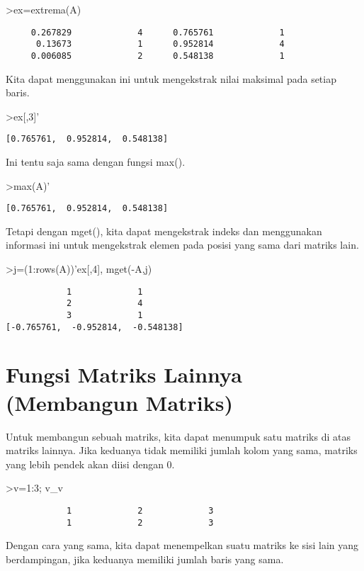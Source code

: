 \documentclass[
]{book}
\begin{document}
\textgreater ex=extrema(A)

\begin{verbatim}
     0.267829             4      0.765761             1 
      0.13673             1      0.952814             4 
     0.006085             2      0.548138             1 
\end{verbatim}

Kita dapat menggunakan ini untuk mengekstrak nilai maksimal pada setiap baris.

\textgreater ex{[},3{]}'

\begin{verbatim}
[0.765761,  0.952814,  0.548138]
\end{verbatim}

Ini tentu saja sama dengan fungsi max().

\textgreater max(A)'

\begin{verbatim}
[0.765761,  0.952814,  0.548138]
\end{verbatim}

Tetapi dengan mget(), kita dapat mengekstrak indeks dan menggunakan informasi ini untuk mengekstrak elemen pada posisi yang sama dari matriks lain.

\textgreater j=(1:rows(A))'\textbar ex{[},4{]}, mget(-A,j)

\begin{verbatim}
            1             1 
            2             4 
            3             1 
[-0.765761,  -0.952814,  -0.548138]
\end{verbatim}

\chapter{Fungsi Matriks Lainnya (Membangun Matriks)}\label{fungsi-matriks-lainnya-membangun-matriks}

Untuk membangun sebuah matriks, kita dapat menumpuk satu matriks di atas matriks lainnya. Jika keduanya tidak memiliki jumlah kolom yang sama, matriks yang lebih pendek akan diisi dengan 0.

\textgreater v=1:3; v\_v

\begin{verbatim}
            1             2             3 
            1             2             3 
\end{verbatim}

Dengan cara yang sama, kita dapat menempelkan suatu matriks ke sisi lain yang berdampingan, jika keduanya memiliki jumlah baris yang sama.
\end{document}
